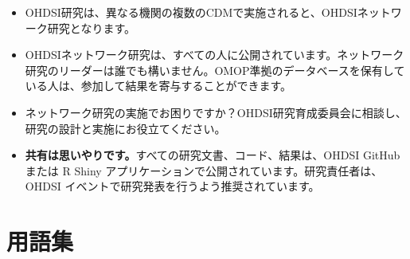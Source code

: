 \documentclass[
  11pt]{book}
\makeatletter
\providecommand{\tightlist}{%
  \setlength{\itemsep}{0pt}\setlength{\parskip}{0pt}}
\newenvironment{kframe}{%
\medskip{}
\setlength{\fboxsep}{.8em}
 \def\at@end@of@kframe{}%
 \ifinner\ifhmode%
  \def\at@end@of@kframe{\end{minipage}}%
  \begin{minipage}{\columnwidth}%
 \fi\fi%
 \def\FrameCommand##1{\hskip\@totalleftmargin \hskip-\fboxsep
 \colorbox{myShadeColor}{##1}\hskip-\fboxsep
     \hskip-\linewidth \hskip-\@totalleftmargin \hskip\columnwidth}%
 \MakeFramed {\advance\hsize-\width
   \@totalleftmargin\z@ \linewidth\hsize
   \@setminipage}}%
 {\par\unskip\endMakeFramed%
 \at@end@of@kframe}
\newenvironment{rmdblock}[1]
  {
  \begin{itemize}
  \renewcommand{\labelitemi}{
    \raisebox{-.7\height}[0pt][0pt]{
      {\setkeys{Gin}{width=3em,keepaspectratio}\texttt{[image: images/\#1]}}
    }
  }
  \setlength{\fboxsep}{1em}
  \begin{kframe}
  \item
  }
  {
  \end{kframe}
  \end{itemize}
  }
\newenvironment{rmdsummary}
  {\begin{rmdblock}{summary}}
  {\end{rmdblock}}
\theoremstyle{definition}
\theoremstyle{definition}
\theoremstyle{definition}
\theoremstyle{definition}
\theoremstyle{remark}
\makeatother
\begin{document}
\begin{rmdsummary}
\begin{itemize}
\tightlist
\item
  OHDSI研究は、異なる機関の複数のCDMで実施されると、OHDSIネットワーク研究となります。
\item
  OHDSIネットワーク研究は、すべての人に公開されています。ネットワーク研究のリーダーは誰でも構いません。OMOP準拠のデータベースを保有している人は、参加して結果を寄与することができます。
\item
  ネットワーク研究の実施でお困りですか？OHDSI研究育成委員会に相談し、研究の設計と実施にお役立てください。
\item
  \textbf{共有は思いやりです。}すべての研究文書、コード、結果は、OHDSI GitHub または R Shiny アプリケーションで公開されています。研究責任者は、OHDSI イベントで研究発表を行うよう推奨されています。
\end{itemize}
\end{rmdsummary}

\appendix {}


\chapter{用語集}\label{Glossary}
\end{document}
